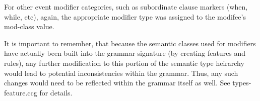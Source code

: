 For other event modifier categories, such as subordinate clause markers (when, while, etc), again, the appropriate modifier type was assigned to the modifee's mod-class value. 

It is important to remember, that because the semantic classes used for modifiers have actually been built into the grammar signature (by creating features and rules), any further modification to this portion of the semantic type heirarchy would lead to potential inconsistencies within the grammar. Thus, any such changes would need to be reflected within the grammar itself as well. See types-feature.ccg for details.

